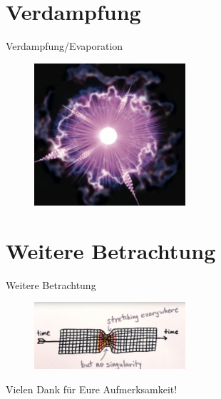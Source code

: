 \documentclass[PHONON = true, screen, ngerman]{beamer}
\begin{document}
	\section{Verdampfung}
	\begin{frame}{Verdampfung/Evaporation}
		\begin{figure} [h] 
			\begin{center}
				\includegraphics[width=0.5\textwidth]{evaporation}
			\end{center}
		\end{figure}
	\end{frame}
	
	\section{Weitere Betrachtung}
	\begin{frame}{Weitere Betrachtung}
		\begin{figure} [h] 
			\begin{center}
				\includegraphics[width=0.5\textwidth]{bounce1}
			\end{center}
		\end{figure} 
	\end{frame}	
	\begin{frame}
		\begin{minipage}[c]{\textwidth}
			\huge{Vielen Dank für Eure Aufmerksamkeit!}
		\end{minipage}		
	\end{frame}
\end{document}
